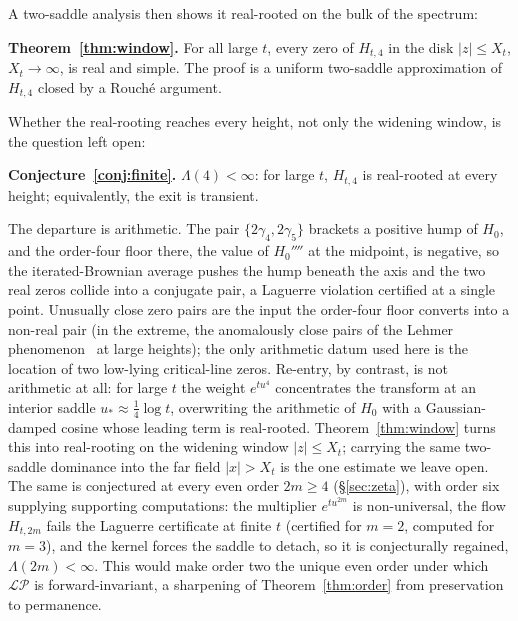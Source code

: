 \documentclass[11pt,reqno]{amsart}
\theoremstyle{plain}
\theoremstyle{definition}
\theoremstyle{remark}
\newenvironment{keyresult}{\par\medskip\noindent}{\par\medskip}
\newcommand{\LP}{\mathcal{LP}}
\begin{document}
A two-saddle analysis then shows it real-rooted on the bulk of the spectrum:

\begin{keyresult}
\textbf{Theorem~\ref{thm:window}.} For all large $t$, every zero of $H_{t,4}$ in
the disk $|z|\le X_t$, $X_t\to\infty$, is real and simple. The proof is a uniform
two-saddle approximation of $H_{t,4}$ closed by a Rouch\'e argument.
\end{keyresult}

Whether the real-rooting reaches every height, not only the widening window, is
the question left open:

\begin{keyresult}
\textbf{Conjecture~\ref{conj:finite}.} $\Lambda(4)<\infty$: for large $t$,
$H_{t,4}$ is real-rooted at every height; equivalently, the exit is transient.
\end{keyresult}

The departure is arithmetic. The pair $\{2\gamma_4,2\gamma_5\}$ brackets a
positive hump of $H_0$, and the order-four floor there, the value of $H_0''''$
at the midpoint, is negative, so the iterated-Brownian average pushes the hump
beneath the axis and the two real zeros collide into a conjugate pair, a
Laguerre violation certified at a single point. Unusually close zero pairs are the input the order-four floor converts into a
non-real pair (in the extreme, the anomalously close pairs of the Lehmer
phenomenon~\cite{CSV} at large heights); the only arithmetic datum used here is
the location of
two low-lying critical-line zeros. Re-entry, by contrast, is not arithmetic at
all: for large $t$ the
weight $e^{tu^4}$ concentrates the transform at an interior saddle
$u_*\approx\tfrac14\log t$, overwriting the arithmetic of $H_0$ with a
Gaussian-damped cosine whose leading term is real-rooted. Theorem~\ref{thm:window}
turns this into real-rooting on the widening window $|z|\le X_t$; carrying the
same two-saddle dominance into the far field $|x|>X_t$ is the one estimate we
leave open. The same is conjectured at every even order $2m\ge4$
(\S\ref{sec:zeta}), with order six
supplying supporting computations: the multiplier $e^{tu^{2m}}$ is non-universal,
the flow $H_{t,2m}$ fails the Laguerre certificate at finite $t$ (certified for
$m=2$, computed for $m=3$), and the kernel forces the saddle to detach, so it is
conjecturally regained, $\Lambda(2m)<\infty$. This would make order two
the unique even order under which $\LP$ is forward-invariant, a sharpening of
Theorem~\ref{thm:order} from preservation to permanence.
\end{document}

